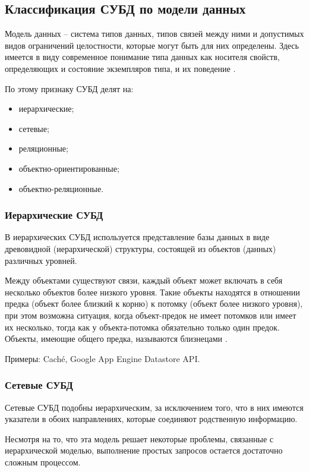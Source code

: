 \documentclass[a4paper,14pt]{extreport}
\begin{document}
\subsection{Классификация СУБД по модели данных}

Модель данных --  система типов данных, типов связей между ними и допустимых видов ограничений целостности, которые могут быть для них определены. Здесь имеется в виду современное понимание типа данных как носителя свойств, определяющих и состояние экземпляров типа, и их поведение \cite{kogal}.

По этому признаку СУБД делят на:

\begin{itemize}
	\setlength\itemsep{0.01em}
	\item иерархические;
	\item сетевые;
	\item реляционные;
	\item объектно-ориентированные;
	\item объектно-реляционные.
\end{itemize}

\subsubsection*{Иерархические СУБД}
В иерархических СУБД используется представление базы данных в виде древовидной (иерархической) структуры, состоящей из объектов (данных) различных уровней.

Между объектами существуют связи, каждый объект может включать в себя несколько объектов более низкого уровня. Такие объекты находятся в отношении предка (объект более близкий к корню) к потомку (объект более низкого уровня), при этом возможна ситуация, когда объект-предок не имеет потомков или имеет их несколько, тогда как у объекта-потомка обязательно только один предок. Объекты, имеющие общего предка, называются близнецами  \cite{scienceforum}.

Примеры: Caché, Google App Engine Datastore API.

\subsubsection*{Сетевые СУБД}
Сетевые СУБД подобны иерархическим, за исключением того, что в них имеются указатели в обоих направлениях, которые соединяют родственную информацию.

Несмотря на то, что эта модель решает некоторые проблемы, связанные с иерархической моделью, выполнение простых запросов остается достаточно сложным процессом.
\end{document}
